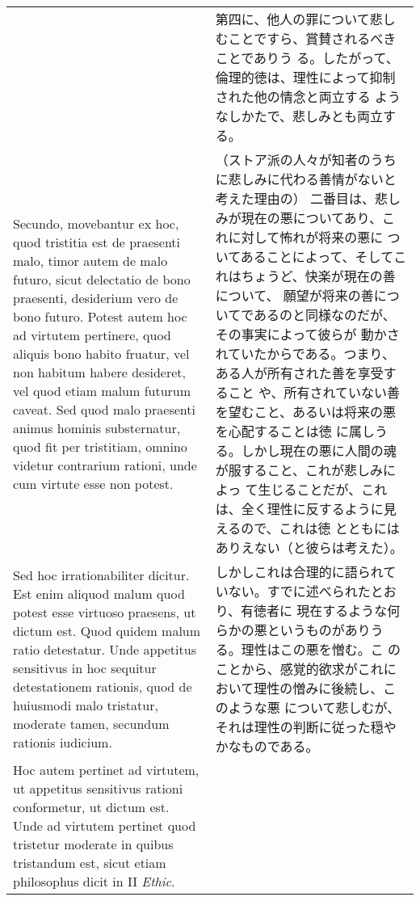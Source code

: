 \documentclass[10pt]{jsarticle}
\begin{document}
\begin{longtable}{p{21em}p{21em}}
&

 第四に、他人の罪について悲しむことですら、賞賛されるべきことでありう
 る。したがって、倫理的徳は、理性によって抑制された他の情念と両立する
 ようなしかたで、悲しみとも両立する。

\\


 Secundo, movebantur ex hoc, quod tristitia est de praesenti malo,
 timor autem de malo futuro, sicut delectatio de bono praesenti,
 desiderium vero de bono futuro. Potest autem hoc ad virtutem
 pertinere, quod aliquis bono habito fruatur, vel non habitum habere
 desideret, vel quod etiam malum futurum caveat. Sed quod malo
 praesenti animus hominis substernatur, quod fit per tristitiam,
 omnino videtur contrarium rationi, unde cum virtute esse non potest.

&

 （ストア派の人々が知者のうちに悲しみに代わる善情がないと考えた理由の）
 二番目は、悲しみが現在の悪についてあり、これに対して怖れが将来の悪に
 ついてあることによって、そしてこれはちょうど、快楽が現在の善について、
 願望が将来の善についてであるのと同様なのだが、その事実によって彼らが
 動かされていたからである。つまり、ある人が所有された善を享受すること
 や、所有されていない善を望むこと、あるいは将来の悪を心配することは徳
 に属しうる。しかし現在の悪に人間の魂が服すること、これが悲しみによっ
 て生じることだが、これは、全く理性に反するように見えるので、これは徳
 とともにはありえない（と彼らは考えた）。

\\


 Sed hoc irrationabiliter dicitur. Est enim aliquod malum quod potest
 esse virtuoso praesens, ut dictum est. Quod quidem malum ratio
 detestatur. Unde appetitus sensitivus in hoc sequitur detestationem
 rationis, quod de huiusmodi malo tristatur, moderate tamen, secundum
 rationis iudicium.

&

 しかしこれは合理的に語られていない。すでに述べられたとおり、有徳者に
 現在するような何らかの悪というものがありうる。理性はこの悪を憎む。こ
 のことから、感覚的欲求がこれにおいて理性の憎みに後続し、このような悪
 について悲しむが、それは理性の判断に従った穏やかなものである。
 

\\

 Hoc autem pertinet ad virtutem, ut appetitus sensitivus rationi
 conformetur, ut dictum est. Unde ad virtutem pertinet quod tristetur
 moderate in quibus tristandum est, sicut etiam philosophus dicit in
 II {\itshape Ethic}.



\end{longtable}
\end{document}
